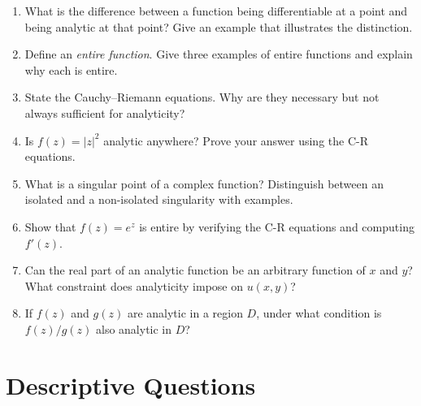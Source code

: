 \documentclass[12pt,a4paper]{article}
\begin{document}
\begin{enumerate}
  \item What is the difference between a function being differentiable at a
        point and being analytic at that point? Give an example that illustrates
        the distinction.

  \item Define an \emph{entire function}. Give three examples of entire functions
        and explain why each is entire.

  \item State the Cauchy--Riemann equations. Why are they necessary but not
        always sufficient for analyticity?

  \item Is $f(z) = |z|^{2}$ analytic anywhere? Prove your answer using the
        C-R equations.

  \item What is a singular point of a complex function? Distinguish between an
        isolated and a non-isolated singularity with examples.

  \item Show that $f(z) = e^{z}$ is entire by verifying the C-R equations and
        computing $f'(z)$.

  \item Can the real part of an analytic function be an arbitrary function of
        $x$ and $y$? What constraint does analyticity impose on $u(x,y)$?

  \item If $f(z)$ and $g(z)$ are analytic in a region $D$, under what condition
        is $f(z)/g(z)$ also analytic in $D$?
\end{enumerate}

\section{Descriptive Questions}
\end{document}
